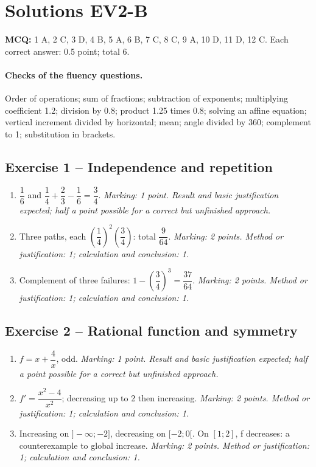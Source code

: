 \clearpage\section*{Solutions EV2-B}\label{EV2-B-CORR}
\textbf{MCQ:} 1 A, 2 C, 3 D, 4 B, 5 A, 6 B, 7 C, 8 C, 9 A, 10 D, 11 D, 12 C. Each correct answer: 0.5 point; total 6.
\paragraph{Checks of the fluency questions.} Order of operations; sum of fractions; subtraction of exponents; multiplying coefficient 1.2; division by 0.8; product 1.25 times 0.8; solving an affine equation; vertical increment divided by horizontal; mean; angle divided by 360; complement to 1; substitution in brackets.
\subsection*{Exercise 1 -- Independence and repetition}
\begin{enumerate}
\item $\dfrac{1}{6}$ and $\dfrac{1}{4}+\dfrac{2}{3}-\dfrac{1}{6}=\dfrac{3}{4}$. \textit{Marking: 1 point. Result and basic justification expected; half a point possible for a correct but unfinished approach.}
\item Three paths, each $(\dfrac{1}{4})^2(\dfrac{3}{4})$: total $\dfrac{9}{64}$. \textit{Marking: 2 points. Method or justification: 1; calculation and conclusion: 1.}
\item Complement of three failures: $1-(\dfrac{3}{4})^3=\dfrac{37}{64}$. \textit{Marking: 2 points. Method or justification: 1; calculation and conclusion: 1.}
\end{enumerate}
\subsection*{Exercise 2 -- Rational function and symmetry}
\begin{enumerate}
\item $f=x+\dfrac{4}{x}$, odd. \textit{Marking: 1 point. Result and basic justification expected; half a point possible for a correct but unfinished approach.}
\item $f\prime =\dfrac{x^2-4}{x^2}$; decreasing up to 2 then increasing. \textit{Marking: 2 points. Method or justification: 1; calculation and conclusion: 1.}
\item Increasing on $]-\infty;-2]$, decreasing on $[-2;0[$. On $[1;2]$, f decreases: a counterexample to global increase. \textit{Marking: 2 points. Method or justification: 1; calculation and conclusion: 1.}
\end{enumerate}
